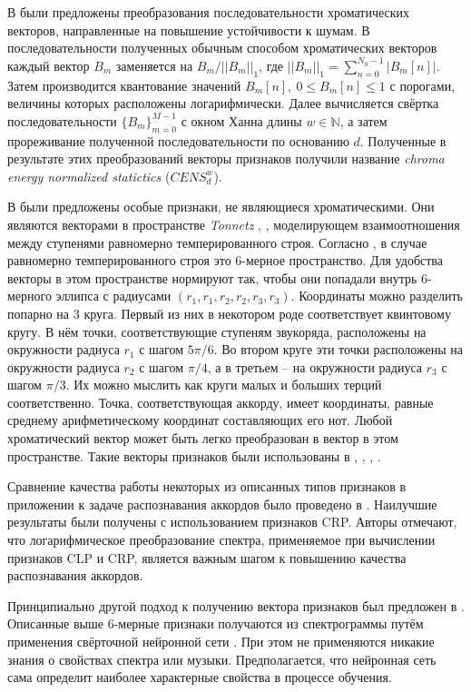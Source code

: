 В \cite{Mueller2007} были предложены преобразования последовательности
хроматических векторов, направленные на повышение устойчивости к шумам.
В последовательности полученных обычным способом хроматических векторов каждый
вектор $B_m$ заменяется на $B_m/||B_m||_1$, где $||B_m||_1 = \sum_{n=0}^{N_0-1}
|B_m[n]|$. Затем производится квантование значений $B_m[n],~0 \leq B_m[n] \leq
1$ с порогами, величины которых расположены логарифмически. Далее вычисляется
свёртка последовательности $\{B_m\}_{m=0}^{M-1}$ с окном Ханна длины $w \in
\mathbb{N}$, а затем прореживание полученной последовательности по основанию
$d$. Полученные в результате этих преобразований векторы признаков получили
название \emph{chroma energy normalized statictics} ($CENS_d^w$).

В \cite{Harte2006} были предложены особые признаки, не являющиеся
хроматическими. Они являются векторами в пространстве \emph{Tonnetz}
\cite{Cohn1998}, \cite{Chew2000}, моделирующем взаимоотношения между ступенями
равномерно темперированного строя. Согласно \cite{Harte2006}, в случае
равномерно темперированного строя это 6-мерное пространство. Для удобства
векторы в этом пространстве нормируют так, чтобы они попадали внутрь 6-мерного
эллипса с радиусами $(r_1, r_1, r_2, r_2, r_3, r_3)$. Координаты можно разделить
попарно на 3 круга. Первый из них в некотором роде соответствует квинтовому
кругу. В нём точки, соответствующие ступеням звукоряда, расположены на
окружности радиуса $r_1$ с шагом $5\pi / 6$. Во втором круге эти точки
расположены на окружности радиуса $r_2$ с шагом $\pi/4$, а в третьем -- на
окружности радиуса $r_3$ с шагом $\pi/3$. Их можно мыслить как круги малых и
больших терций соответственно. Точка, соответствующая аккорду, имеет координаты,
равные среднему арифметическому координат составляющих его нот. Любой
хроматический вектор может быть легко преобразован в вектор в этом пространстве.
Такие векторы признаков были использованы в \cite{Lee2007}, \cite{Lee2008},
\cite{Chen2012}, \cite{Humphrey2012}.

Сравнение качества работы некоторых из описанных типов признаков в приложении к
задаче распознавания аккордов было проведено в \cite{Jiang2011}. Наилучшие
результаты были получены с использованием признаков CRP. Авторы отмечают, что
логарифмическое преобразование спектра, применяемое при вычислении признаков CLP
и CRP, является важным шагом к повышению качества распознавания аккордов.

Принципиально другой подход к получению вектора признаков был предложен в
\cite{Humphrey2012}. Описанные выше 6-мерные признаки получаются из
спектрограммы путём применения свёрточной нейронной сети \cite{LeCun1998}. При
этом не применяются никакие знания о свойствах спектра или музыки.
Предполагается, что нейронная сеть сама определит наиболее характерные свойства
в процессе обучения.

